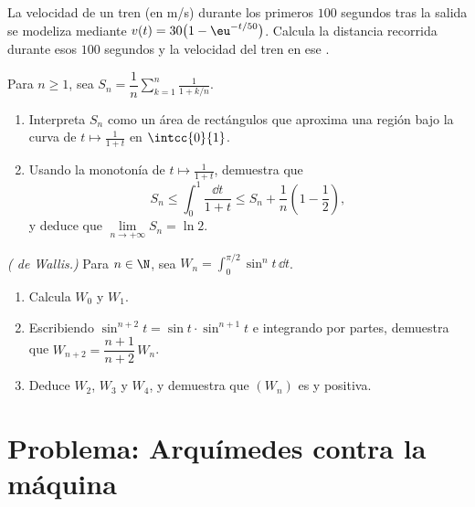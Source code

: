 \begin{exercise}[$\star\star$]\label{exo:g12:integ:7}
La velocidad de un tren (en m/s) durante los primeros $100$ segundos tras
la salida se modeliza mediante $v(t) = 30\bigl(1 - \eu^{-t/50}\bigr)$.
Calcula la distancia recorrida durante esos $100$ segundos y la velocidad
 del tren en ese .
\end{exercise}

\begin{exercise}[$\star\star\star$]\label{exo:g12:integ:8}
Para $n \geq 1$, sea
$S_n = \dfrac1n \displaystyle\sum_{k=1}^{n} \frac{1}{1 + k/n}$.
\begin{enumerate}
  \item Interpreta $S_n$ como un área de rectángulos que aproxima una
        región bajo la curva de $t \mapsto \frac{1}{1+t}$ en
        $\intcc{0}{1}$.
  \item Usando la monotonía de $t \mapsto \frac{1}{1+t}$, demuestra que
        \[
        S_n \leq \int_0^1 \frac{\dd t}{1+t} \leq S_n + \frac1n\left(1 - \frac12\right),
        \]
        y deduce que $\lim\limits_{n\to+\infty} S_n = \ln 2$.
\end{enumerate}
\end{exercise}

\begin{exercise}[$\star\star\star$]\label{exo:g12:integ:9}
\emph{( de Wallis.)} Para $n \in \N$, sea
$W_n = \displaystyle\int_0^{\pi/2} \sin^n t\,\dd t$.
\begin{enumerate}
  \item Calcula $W_0$ y $W_1$.
  \item Escribiendo $\sin^{n+2}t = \sin t \cdot \sin^{n+1} t$ e integrando
        por partes, demuestra que $W_{n+2} = \dfrac{n+1}{n+2}\,W_n$.
  \item Deduce $W_2$, $W_3$ y $W_4$, y demuestra que $(W_n)$ es 
        y positiva.
\end{enumerate}
\end{exercise}

\section{Problema: Arquímedes contra la máquina}

